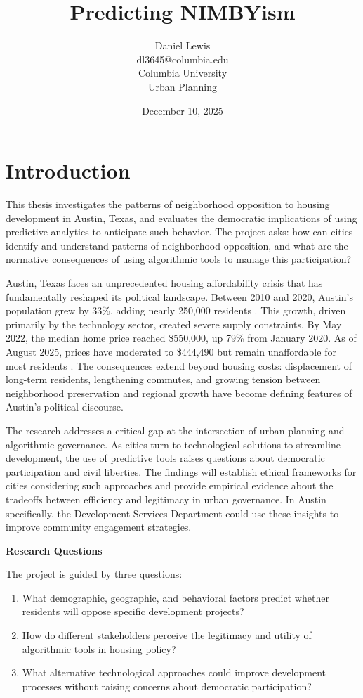 \documentclass[12pt]{article}
\title{Predicting NIMBYism}
\author{Daniel Lewis\\
dl3645@columbia.edu\\
Columbia University\\
Urban Planning}
\date{December 10, 2025}
\begin{document}
\maketitle

\section{Introduction}

This thesis investigates the patterns of neighborhood opposition to housing development in Austin, Texas, and evaluates the democratic implications of using predictive analytics to anticipate such behavior. The project asks: how can cities identify and understand patterns of neighborhood opposition, and what are the normative consequences of using algorithmic tools to manage this participation?

Austin, Texas faces an unprecedented housing affordability crisis that has fundamentally reshaped its political landscape. Between 2010 and 2020, Austin's population grew by 33\%, adding nearly 250,000 residents \autocite{census2020}. This growth, driven primarily by the technology sector, created severe supply constraints. By May 2022, the median home price reached \$550,000, up 79\% from January 2020. As of August 2025, prices have moderated to \$444,490 but remain unaffordable for most residents \autocite{unlockMLS2025}. The consequences extend beyond housing costs: displacement of long-term residents, lengthening commutes, and growing tension between neighborhood preservation and regional growth have become defining features of Austin's political discourse.

The research addresses a critical gap at the intersection of urban planning and algorithmic governance. As cities turn to technological solutions to streamline development, the use of predictive tools raises questions about democratic participation and civil liberties. The findings will establish ethical frameworks for cities considering such approaches and provide empirical evidence about the tradeoffs between efficiency and legitimacy in urban governance. In Austin specifically, the Development Services Department could use these insights to improve community engagement strategies.

\textbf{Research Questions}

The project is guided by three questions:
\begin{enumerate}
\item[a.] What demographic, geographic, and behavioral factors predict whether residents will oppose specific development projects?
\item[b.] How do different stakeholders perceive the legitimacy and utility of algorithmic tools in housing policy?
\item[c.] What alternative technological approaches could improve development processes without raising concerns about democratic participation?
\end{enumerate}
\end{document}
